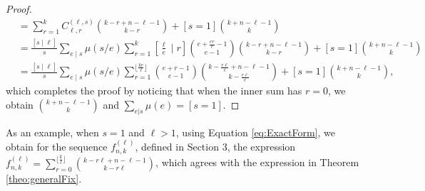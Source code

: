 \documentclass[12pt]{amsart}
\begin{document}
\begin{proof}
\begin{align*}
    &=\sum _{r=1}^kC^{(\ell,s)}_{\ell,r}\binom{k-r+n-\ell-1}{k-r}+[s=1]\binom{k+n-\ell-1}{k}\\
    &=\frac{[s \mid \ell]}{s}\sum _{e\mid s}\mu(s/e)\sum _{r=1}^k\left [\frac{\ell}{e}\mid r \right]\binom{e+\frac{er}{\ell}-1}{e-1}\binom{k-r+n-\ell-1}{k-r}+[s=1]\binom{k+n-\ell-1}{k}\\
    &=\frac{[s \mid \ell]}{s}\sum _{e\mid s}\mu(s/e)\sum _{r=1}^{\lfloor\frac{ke}{\ell}\rfloor}\binom{e+r-1}{e-1}\binom{k-\frac{r\ell}{e}+n-\ell-1}{k-\frac{r\ell}{e}}+[s=1]\binom{k+n-\ell-1}{k},
\end{align*}
which completes the proof by noticing that when the inner sum has $r=0$, we obtain $\binom{k+n-\ell-1}{k}$ and $\sum _{e|s}{\mu (e)}=[s=1]$.
\end{proof}
As an example, when $s=1$ and $\ell >1$, using Equation \ref{eq:ExactForm}, we obtain for the sequence $f^{(\ell)}_{n,k}$, defined in Section 3, the expression  $\displaystyle f_{n,k}^{(\ell)} =  \sum _{r=0}^{\lfloor\frac{k}{\ell}\rfloor}\binom{k-{r\ell}+n-\ell-1}{k-{r\ell}}$, which agrees with the expression in Theorem \ref{theo:generalFix}.
\printbibliography
\end{document}
